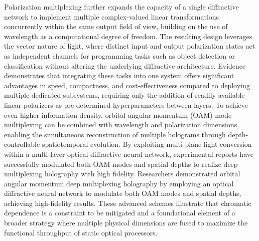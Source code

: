 Polarization multiplexing further expands the capacity of a single diffractive network to implement multiple complex-valued linear transformations concurrently within the same output field of view, building on the use of wavelength as a computational degree of freedom. The resulting design leverages the vector nature of light, where distinct input and output polarization states act as independent channels for programming tasks such as object detection or classification without altering the underlying diffractive architecture. Evidence demonstrates that integrating these tasks into one system offers significant advantages in speed, compactness, and cost-effectiveness compared to deploying multiple dedicated subsystems, requiring only the addition of readily available linear polarizers as pre-determined hyperparameters between layers. To achieve even higher information density, orbital angular momentum (OAM) mode multiplexing can be combined with wavelength and polarization dimensions, enabling the simultaneous reconstruction of multiple holograms through depth-controllable spatiotemporal evolution. By exploiting multi-plane light conversion within a multi-layer optical diffractive neural network, experimental reports have successfully modulated both OAM modes and spatial depths to realize deep multiplexing holography with high fidelity. Researchers demonstrated orbital angular momentum deep multiplexing holography by employing an optical diffractive neural network to modulate both OAM modes and spatial depths, achieving high-fidelity results. \citep{doi_10_1364_oe_447337_61ffab71} These advanced schemes illustrate that chromatic dependence is a constraint to be mitigated and a foundational element of a broader strategy where multiple physical dimensions are fused to maximize the functional throughput of static optical processors. \citep{doi_10_1038_s41377_022_00849_x_e31226af} \citep{doi_10_1364_oe_447337_61ffab71}

